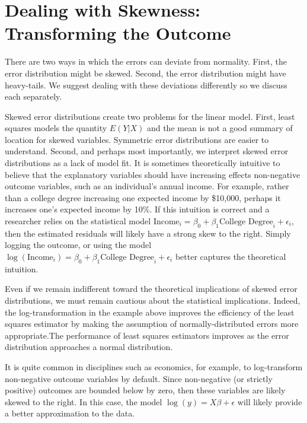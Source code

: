 \documentclass[12pt]{article}
\begin{document}
\section*{Dealing with Skewness: Transforming the Outcome}

There are two ways in which the errors can deviate from normality. First, the error distribution might be skewed. Second, the error distribution might have heavy-tails. We suggest dealing with these deviations differently so we discuss each separately.

Skewed error distributions create two problems for the linear model. First, least squares models the quantity $E(Y | X)$ and the mean is not a good summary of location for skewed variables. Symmetric error distributions are easier to understand. Second, and perhaps most importantly, we interpret skewed error distributions as a lack of model fit. It is sometimes theoretically intuitive to believe that the explanatory variables should have increasing effects non-negative outcome variables, such as an individual's annual income. For example, rather than a college degree increasing one expected income by \$10,000, perhaps it increases one's expected income by 10\%. If this intuition is correct and a researcher relies on the statistical model $\text{Income}_i = \beta_0 + \beta_1 \text{College Degree}_i + \epsilon_i$, then the estimated residuals will likely have a strong skew to the right. Simply logging the outcome, or using the model $\log (\text{Income}_i) = \beta_0 + \beta_1 \text{College Degree}_i + \epsilon_i$ better captures the theoretical intuition.



Even if we remain indifferent toward the theoretical implications of skewed error distributions, we must remain cautious about the statistical implications. Indeed, the log-transformation in the example above improves the efficiency of the least squares estimator by making the assumption of normally-distributed errors more appropriate.The performance of least squares estimators improves as the error distribution approaches a normal distribution. 

It is quite common in disciplines such as economics, for example, to log-transform non-negative outcome variables by default. Since non-negative (or strictly positive) outcomes are bounded below by zero, then these variables are likely skewed to the right. In this case, the model $\log(y) = X\beta + \epsilon$ will likely provide a better approximation to the data.
\end{document}
